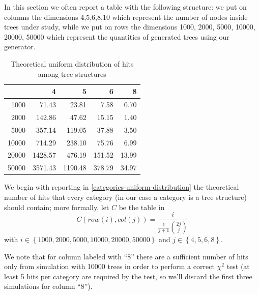 In this section we often report a table with the following structure:
we put on columns the dimensions 4,5,6,8,10 which represent the number
of nodes inside trees under study, while we put on rows the dimensions
1000, 2000, 5000, 10000, 20000, 50000 which represent the quantities
of generated trees using our generator.
\begin{table}[ht]
  \begin{center}
    \begin{tabular}{rrrrr}
      \hline
      & 4 & 5 & 6 & 8 \\ 
      \hline
      1000 & 71.43 & 23.81 & 7.58 & 0.70 \\ 
      2000 & 142.86 & 47.62 & 15.15 & 1.40 \\ 
      5000 & 357.14 & 119.05 & 37.88 & 3.50 \\ 
      10000 & 714.29 & 238.10 & 75.76 & 6.99 \\ 
      20000 & 1428.57 & 476.19 & 151.52 & 13.99 \\ 
      50000 & 3571.43 & 1190.48 & 378.79 & 34.97 \\ 
      \hline
    \end{tabular}
    \label{categories-uniform-distribution}
    \caption{Theoretical uniform distribution of hits among tree
      structures}
  \end{center}
\end{table}
We begin with reporting in
\autoref{categories-uniform-distribution} the theoretical number
of hits that every category (in our case a category is a tree
structure) should contain; more formally, let $C$ be the table in
\begin{displaymath}
  C(row(i),col(j)) = \frac{i}{\frac{1}{j+1}{{2j}\choose{j}}}
\end{displaymath}
with $i \in \left \lbrace 1000, 2000, 5000, 10000, 20000, 50000
\right\rbrace $ and $j \in \left \lbrace 4, 5, 6, 8 \right\rbrace $.

We note that for column labeled with ``8'' there are a sufficient
number of hits only from simulation with 10000 trees in order to
perform a correct $\chi^2$ test (at least 5 hits per category are
required by the test, so we'll discard the first three simulations for
column ``8'').

